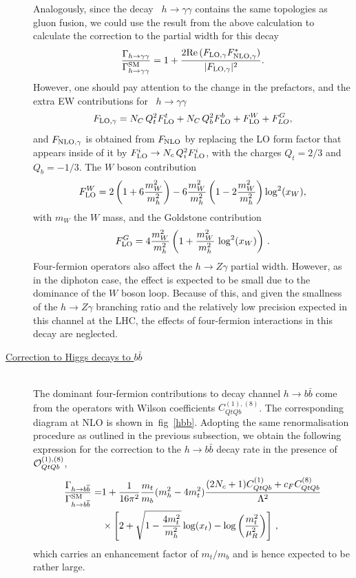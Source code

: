 \begin{description}
	Analogously, since the decay ~$ h \to \gamma \gamma$ contains the same topologies as gluon fusion, we could use the result from the above calculation to calculate the correction to the partial width for this decay
	\begin{equation}
		\frac{\Gamma_{h\to \gamma\gamma}}{\Gamma_{h\to \gamma\gamma}^{\mathrm{SM}}}= 1+ \frac{2 \mbox{Re}\,(F_{\textrm{LO}, \gamma} F^*_{\textrm{NLO},\gamma})}{  |F_{\textrm{LO}, \gamma}|^2} .
	\end{equation}
	However, one should pay attention to the change in the prefactors, and the extra EW contributions for ~$ h \to \gamma \gamma$ 
	\begin{equation}
		F_{\textrm{LO}, \gamma}= N_C\,Q_t^2 F_{\textrm{LO}}^t+ N_C\,Q_b^2 F_{\textrm{LO}}^b+F_{\textrm{LO}}^W+ F^G_{LO} ,
	\end{equation}
	and $F_{\textrm{NLO}, \gamma}$ is obtained from $F_{\textrm{NLO}}$ by replacing the LO form factor that appears inside of it by  $ F_{\textrm{LO}}^i \to N_c \,Q_i^2 F_{\textrm{LO}}^i$,
	with the charges $Q_t=2/3$ and $Q_b=-1/3$. The $W$ boson contribution
	\begin{equation}
		F_{\textrm{LO}}^W= 2 \left(1+6 \frac{m_W^2}{m_h^2}\right)-6 \frac{m_W^2}{  m_h^2} \left(1-2  \frac{m_W^2}{m_h^2}\right) \log^2(x_W),
	\end{equation}
	with $m_W$ the $W$ mass, and the Goldstone contribution
	\begin{equation}
		F_{\textrm{LO}}^G=4\frac{m_W^2}{m_h^2} \left( 1+ \frac{m_W^2}{m_h^2} \,\log^2(x_W) \right)\,.
	\end{equation}
Four-fermion operators also affect the $h\to Z\gamma$ partial width. However, as in the diphoton case, the effect is expected to be small due to the dominance of the $W$ boson loop. Because of this, and given the smallness of the $h\to Z\gamma$ branching ratio and the relatively low precision expected in this channel at the LHC, the effects of four-fermion interactions in this decay are neglected.
\item [\underline{Correction to Higgs decays to $b \bar{b}$ }] \hfill  \vspace{0.3cm} \\
The dominant four-fermion contributions to decay channel $h \to b\bar b$ come from the operators with Wilson coefficients $C_{QtQb}^{(1),(8)}$. The corresponding diagram at NLO is shown in~fig~\ref{hbb}. 
Adopting the same renormalisation procedure as outlined in the previous subsection, we obtain the following expression for the correction to 
the $h \to b\bar b$ decay rate in the presence of ${\cal O}_{QtQb}^{(1),(8)}$,
\begin{equation}
	\begin{split}
		\frac{\Gamma_{h\to b\overline{b}}}{\Gamma_{h\to b\overline{b}}^{\mathrm{SM}}}=& 1+ \frac{1}{16\pi^2}\frac{m_t}{m_b}(m_h^2-4m_t^2)\frac{(2 N_c+1) C_{QtQb}^{(1)}+c_F C_{QtQb}^{(8)}}{\Lambda^2} \\ & \times\left[ 2+\sqrt{1-\frac{4 m_t^2}{m_h^2}}\log(x_t)-\log\left(\frac{m_t^2}{\mu_R^2}\right) \right] \,,
		\label{hbbnlo}
	\end{split}
\end{equation}
which carries an enhancement factor of $m_t/m_b$ and is hence expected to be rather large.
\end{description}
